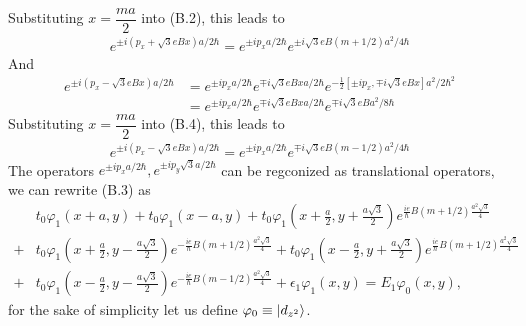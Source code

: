 \documentclass{report}
\newcommand{\f}[2]{\dfrac{#1}{#2}}
\begin{document}
Substituting $x = \f{ma}{2}$ into (B.2), this leads to
\begin{gather}
	e^{\pm i(p_{x} + \sqrt{3} e B x) a / 2\hbar}
	= e^{\pm i p_{x} a / 2 \hbar} e^{\pm i\sqrt{3} e B (m + 1 /2) a^{2} / 4 \hbar}
\end{gather}
And
\begin{equation}
	\begin{aligned}
		e^{\pm i(p_{x} - \sqrt{3} e B x) a / 2\hbar}
		 & = e^{\pm i p_{x} a / 2 \hbar} e^{\mp i\sqrt{3} e B x a / 2 \hbar} e^{-\frac{1}{2} \left[\pm i p_{x}, \mp i \sqrt{3} e B x\right] a^{2} / 2 \hbar^{2}} \\
		 & = e^{\pm i p_{x} a / 2 \hbar} e^{\mp i\sqrt{3} e B x a / 2 \hbar} e^{\mp i \sqrt{3} e B a^{2} / 8 \hbar}
	\end{aligned}
\end{equation}
Substituting $x = \f{ma}{2}$ into (B.4), this leads to
\begin{gather}
	e^{\pm i(p_{x} - \sqrt{3} e B x) a / 2\hbar}
	= e^{\pm i p_{x} a / 2 \hbar} e^{\mp i\sqrt{3} e B (m - 1 /2) a^{2} / 4 \hbar}
\end{gather}
The operators $e^{\pm i p_{x} a / 2 \hbar}, e^{\pm i p_{y} \sqrt{3}a / 2 \hbar}$ can be regconized as translational operators, we can rewrite (B.3) as
\begin{equation}
	\begin{aligned}
		  & t_{0} \varphi_{1} (x + a,y) + t_{0}\varphi_{1} (x - a,y) + t_{0}\varphi_{1} (x + \frac{a}{2},y + \frac{a\sqrt{3}}{2}) e^{\frac{ie}{\hbar}B(m + 1 /2) \frac{a^{2}\sqrt{3}}{4}}                                                            \\
		+ & t_{0} \varphi_{1} (x + \frac{a}{2},y - \frac{a\sqrt{3}}{2}) e^{-\frac{ie}{\hbar}B(m + 1/2) \frac{a^{2}\sqrt{3}}{4}} + t_{0} \varphi_{1} (x - \frac{a}{2},y + \frac{a\sqrt{3}}{2}) e^{\frac{ie}{\hbar}B(m + 1/2) \frac{a^{2}\sqrt{3}}{4}} \\
		+ & t_{0} \varphi_{1} (x - \frac{a}{2},y - \frac{a\sqrt{3}}{2}) e^{-\frac{ie}{\hbar}B(m - 1/2) \frac{a^{2}\sqrt{3}}{4}} + \epsilon_{1} \varphi_{1}(x,y) = E_{1} \varphi_{0}(x,y),
	\end{aligned}
\end{equation}
for the sake of simplicity let us define $\varphi_{0} \equiv \ket{d_{z^{2}}}$.\\
\end{document}
